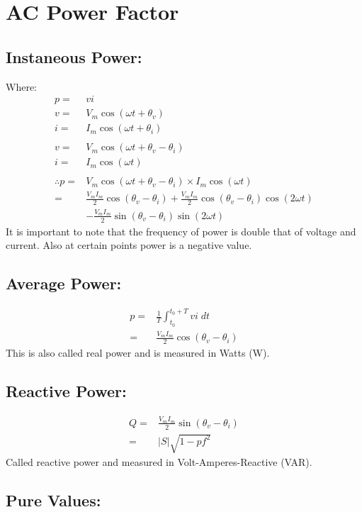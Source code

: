 \documentclass[a5paper]{article}
\begin{document}
	\section{AC Power Factor}
	\subsection{Instaneous Power:}
	Where:
	\begin{align*}
		p=&vi\\
		v=&V_{m}\cos{(\omega t+\theta_{v})}\\
		i=&I_{m}\cos{(\omega t+\theta_{i})}\\\\
		v=&V_{m}\cos{(\omega t+\theta_{v}-\theta_{i})}\\
		i=&I_{m}\cos{(\omega t)}\\\\
		\therefore p=&V_{m}\cos{(\omega t+\theta_{v}-\theta_{i})}\times I_{m}\cos{(\omega t)}\\
		=&\frac{V_{m}I_{m}}{2}\cos{(\theta_{v}-\theta_{i})}+\frac{V_{m}I_{m}}{2}\cos{(\theta_{v}-\theta_{i})}\cos{(2\omega t)}\\
		 &-\frac{V_{m}I_{m}}{2}\sin{(\theta_{v}-\theta_{i})}\sin{(2\omega t)}
	\end{align*}
	It is important to note that the frequency of power is double that of voltage and current. Also at certain points power is a negative value.
	\subsection{Average Power:}
	\begin{align*}
		p=&\frac{1}{T}\int^{t_{0}+T}_{t_{0}}vi\;dt\\
		=&\frac{V_{m}I_{m}}{2}\cos{(\theta_{v}-\theta_{i})}
	\end{align*}
	This is also called real power and is measured in Watts (W).
	\subsection{Reactive Power:}
	\begin{align*}
		Q=&\frac{V_{m}I_{m}}{2}\sin{(\theta_{v}-\theta_{i})}\\
		=&\lvert S \rvert\sqrt{1-pf^{2}}
	\end{align*}
	Called reactive power and measured in Volt-Amperes-Reactive (VAR).
	\subsection{Pure Values:}
\end{document}
